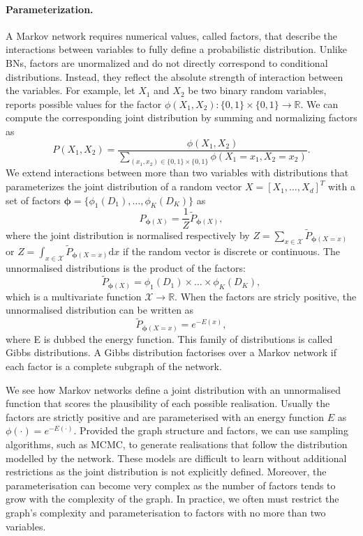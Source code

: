 \paragraph{Parameterization.}
A Markov network requires numerical values, called factors, that describe the interactions between variables to fully define a probabilistic distribution. Unlike BNs, factors are unormalized and do not directly correspond to conditional distributions. Instead, they reflect the absolute strength of interaction between the variables. For example, let $X_1$ and $X_2$ be two binary random variables,  reports possible values for the factor $\phi(X_1, X_2): \{ 0, 1\} \times \{ 0, 1\} \rightarrow \mathbb{R}$. We can compute the corresponding joint distribution by summing and normalizing factors as
$$ P(X_1, X_2) = \frac{\phi(X_1, X_2)}{\sum_{(x_1, x_2) \in \{ 0, 1 \} \times \{ 0, 1\} } \phi(X_1=x_1, X_2=x_2)}. $$
We extend interactions between more than two variables with distributions that parameterizes the joint distribution of a random vector $X = \left[X_1, \hdots, X_d\right]^T$ with a set of factors $\bm{\phi} = \{ \phi_1(D_1), \dots, \phi_K(D_K) \}$ as
$$P_{\bm{\phi}(X)} = \frac{1}{Z}\tilde{P}_{\bm{\phi}(X)},$$
where the joint distribution is normalised respectively by $Z=\sum_{x \in \mathcal{X}}\tilde{P}_{\bm{\phi}(X=x)}$ or  $Z=\int_{x \in \mathcal{X}}\tilde{P}_{\bm{\phi}(X=x)}\text{d}x$ if the random vector is discrete or continuous. The unnormalised distributions is the product of the factors:
$$ \tilde{P}_{\bm{\phi}(X)} = \phi_1(D_1) \times \dots \times \phi_K(D_K), $$
which is a multivariate function $\mathcal{X} \rightarrow \mathbb{R}$. When the factors are stricly positive, the unnormalised distribution can be written as $$ \tilde{P}_{\bm{\phi}(X=x)} = e^{-E(x)}, $$ where E is dubbed the energy function. This family of distributions is called Gibbs distributions. A Gibbs distribution factorises over a Markov network if each factor is a complete subgraph of the network.

We see how Markov networks define a joint distribution with an unnormalised function that scores the plausibility of each possible realisation. Usually the factors are strictly positive and are parameterised with an energy function $E$ as $\phi(\cdot) = e^{-E(\cdot)}$. Provided the graph structure and factors, we can use sampling algorithms, such as MCMC, to generate realisations that follow the distribution modelled by the network. These models are difficult to learn without additional restrictions as the joint distribution is not explicitly defined. Moreover, the parameterisation can become very complex as the number of factors tends to grow with the complexity of the graph. In practice, we often must restrict the graph's complexity and parameterisation to factors with no more than two variables.


